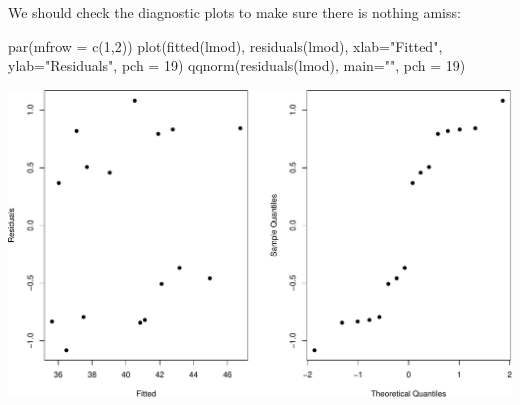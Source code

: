 \documentclass[
  ignorenonframetext,
]{beamer}
\newenvironment{Shaded}{\begin{snugshade}}{\end{snugshade}}
\newcommand{\AttributeTok}[1]{\textcolor[rgb]{0.77,0.63,0.00}{#1}}
\newcommand{\DecValTok}[1]{\textcolor[rgb]{0.00,0.00,0.81}{#1}}
\newcommand{\FunctionTok}[1]{\textcolor[rgb]{0.00,0.00,0.00}{#1}}
\newcommand{\NormalTok}[1]{#1}
\newcommand{\StringTok}[1]{\textcolor[rgb]{0.31,0.60,0.02}{#1}}
\begin{document}
\begin{frame}[fragile]{}
\protect\hypertarget{section-9}{}
We should check the diagnostic plots to make sure there is nothing
amiss:

\vspace{12pt}
\tiny

\begin{Shaded}
\begin{Highlighting}[]
\FunctionTok{par}\NormalTok{(}\AttributeTok{mfrow =} \FunctionTok{c}\NormalTok{(}\DecValTok{1}\NormalTok{,}\DecValTok{2}\NormalTok{))}
\FunctionTok{plot}\NormalTok{(}\FunctionTok{fitted}\NormalTok{(lmod), }\FunctionTok{residuals}\NormalTok{(lmod), }\AttributeTok{xlab=}\StringTok{"Fitted"}\NormalTok{, }\AttributeTok{ylab=}\StringTok{"Residuals"}\NormalTok{, }\AttributeTok{pch =} \DecValTok{19}\NormalTok{)}
\FunctionTok{qqnorm}\NormalTok{(}\FunctionTok{residuals}\NormalTok{(lmod), }\AttributeTok{main=}\StringTok{""}\NormalTok{, }\AttributeTok{pch =} \DecValTok{19}\NormalTok{)}
\end{Highlighting}
\end{Shaded}

\includegraphics{week11p2_files/figure-beamer/unnamed-chunk-9-1.pdf}
\end{frame}
\end{document}
